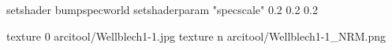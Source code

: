 setshader bumpspecworld
setshaderparam "specscale" 0.2 0.2 0.2

texture 0 arcitool/Wellblech1-1.jpg
texture n arcitool/Wellblech1-1_NRM.png
